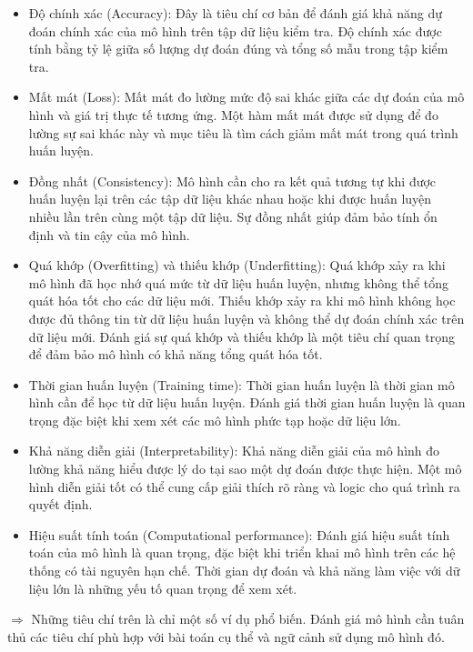 \begin{itemize}
	\item Độ chính xác (Accuracy): Đây là tiêu chí cơ bản để đánh giá khả năng dự đoán chính xác của mô hình trên tập dữ liệu kiểm tra. Độ chính xác được tính bằng tỷ lệ giữa số lượng dự đoán đúng và tổng số mẫu trong tập kiểm tra.
	
	\item Mất mát (Loss): Mất mát đo lường mức độ sai khác giữa các dự đoán của mô hình và giá trị thực tế tương ứng. Một hàm mất mát được sử dụng để đo lường sự sai khác này và mục tiêu là tìm cách giảm mất mát trong quá trình huấn luyện.
	
	\item Đồng nhất (Consistency): Mô hình cần cho ra kết quả tương tự khi được huấn luyện lại trên các tập dữ liệu khác nhau hoặc khi được huấn luyện nhiều lần trên cùng một tập dữ liệu. Sự đồng nhất giúp đảm bảo tính ổn định và tin cậy của mô hình.
	
	\item Quá khớp (Overfitting) và thiếu khớp (Underfitting): Quá khớp xảy ra khi mô hình đã học nhớ quá mức từ dữ liệu huấn luyện, nhưng không thể tổng quát hóa tốt cho các dữ liệu mới. Thiếu khớp xảy ra khi mô hình không học được đủ thông tin từ dữ liệu huấn luyện và không thể dự đoán chính xác trên dữ liệu mới. Đánh giá sự quá khớp và thiếu khớp là một tiêu chí quan trọng để đảm bảo mô hình có khả năng tổng quát hóa tốt.
	
	\item Thời gian huấn luyện (Training time): Thời gian huấn luyện là thời gian mô hình cần để học từ dữ liệu huấn luyện. Đánh giá thời gian huấn luyện là quan trọng đặc biệt khi xem xét các mô hình phức tạp hoặc dữ liệu lớn.	
	
	\item Khả năng diễn giải (Interpretability): Khả năng diễn giải của mô hình đo lường khả năng hiểu được lý do tại sao một dự đoán được thực hiện. Một mô hình diễn giải tốt có thể cung cấp giải thích rõ ràng và logic cho quá trình ra quyết định.
	
	\item Hiệu suất tính toán (Computational performance): Đánh giá hiệu suất tính toán của mô hình là quan trọng, đặc biệt khi triển khai mô hình trên các hệ thống có tài nguyên hạn chế. Thời gian dự đoán và khả năng làm việc với dữ liệu lớn là những yếu tố quan trọng để xem xét.
\end{itemize}

$\Longrightarrow$ Những tiêu chí trên là chỉ một số ví dụ phổ biến. Đánh giá mô hình cần tuân thủ các tiêu chí phù hợp với bài toán cụ thể và ngữ cảnh sử dụng mô hình đó.

